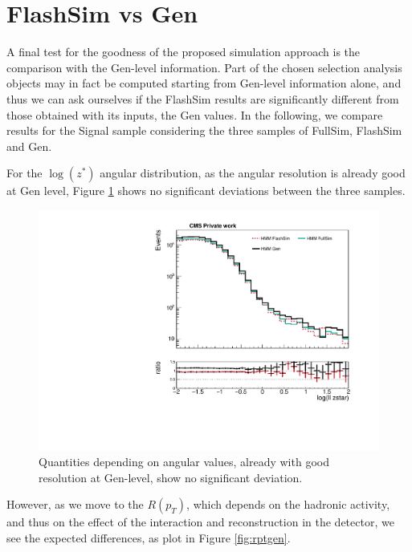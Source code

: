 \section{FlashSim vs Gen}

A final test for the goodness of the proposed simulation approach is the comparison with the Gen-level information. Part of the chosen selection analysis objects may in fact be computed starting from Gen-level information alone, and thus we can ask ourselves if the FlashSim results are significantly different from those obtained with its inputs, the Gen values. In the following, we compare results for the Signal sample considering the three samples of FullSim, FlashSim and Gen.

For the $\log(z^*)$ angular distribution, as the angular resolution is already good at Gen level, Figure \ref{fig:zstargen} shows no significant deviations between the three samples.

\begin{figure}
    \centering
    \includegraphics[width=\linewidth]{gfx/ch6/gen_vs_flash_ll_zstar_log___PreSel_log.pdf}
    \caption[Gen vs FlashSim for $z^*$]{Quantities depending on angular values, already with good resolution at Gen-level, show no significant deviation.}
    \label{fig:zstargen}
   \end{figure}
 
However, as we move to the $R(p_T)$, which depends on the hadronic activity, and thus on the effect of the interaction and reconstruction in the detector, we see the expected differences, as plot in Figure \ref{fig:rptgen}.

